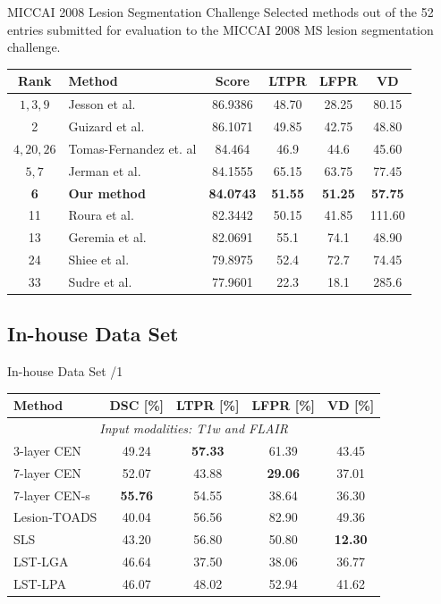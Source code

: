 \documentclass{beamer}
\begin{document}
\begin{frame}{MICCAI 2008 Lesion Segmentation Challenge}
%
Selected methods out of the 52 entries submitted for evaluation to the
MICCAI 2008 MS lesion segmentation challenge.
\begin{center}
\begin{tabular}{@{}clS[table-format=2.2]
S[table-format=2.1,round-precision=1]
S[table-format=2.1,round-precision=1]
S[table-format=2.1,round-precision=1]@{}}
\toprule
Rank & Method & {Score} & {LTPR} & {LFPR} & {VD} \\
\midrule
$1,3,9$  & Jesson et al. & 86.9386 & 48.70 & 28.25 & 80.15 \\
2  & Guizard et al.  & 86.1071 & 49.85 & 42.75 & 48.80 \\
$4,20,26$  & Tomas-Fernandez et. al & 84.464 & 46.9 & 44.6 &
45.60 \\
$5,7$ & Jerman et al.    & 84.1555 & 65.15 & 63.75 & 77.45 \\
\bfseries 6  & \bfseries Our method  & \bfseries 84.0743 & \bfseries 51.55 &
\bfseries 51.25 & \bfseries 57.75 \\
11 & Roura et al.   & 82.3442 & 50.15 & 41.85 & 111.60 \\
13 & Geremia et al.& 82.0691 & 55.1 & 74.1 & 48.90 \\
24 & Shiee et al. & 79.8975 & 52.4 & 72.7 & 74.45 \\
33 & Sudre et al. & 77.9601 & 22.3 & 18.1 & 285.6 \\
\bottomrule
\end{tabular}
\end{center}
\end{frame}

\subsection{In-house Data Set}

\begin{frame}{In-house Data Set /1}
\begin{center}
\begin{tabular}{@{}lcccc@{}}
\toprule
Method & DSC [\%] & LTPR [\%] & LFPR [\%] & VD [\%] \\
\midrule
\multicolumn{5}{c}{\textit{Input modalities: T1w and FLAIR}} \\
\midrule
3-layer CEN & 49.24 & \bfseries 57.33 & 61.39 & 43.45 \\
7-layer CEN & 52.07 & 43.88 & \bfseries 29.06 & 37.01 \\ 
7-layer CEN-s & \bfseries 55.76 & 54.55 & 38.64 & 36.30 \\[0.2em]
Lesion-TOADS & 40.04 & 56.56 & 82.90 & 49.36 \\ 
SLS & 43.20 &  56.80 & 50.80 & \bfseries 12.30 \\
LST-LGA & 46.64 & 37.50 & 38.06 & 36.77 \\
LST-LPA & 46.07 & 48.02 & 52.94 & 41.62 \\
\bottomrule
\end{tabular}
\end{center}
\end{frame}
\end{document}
